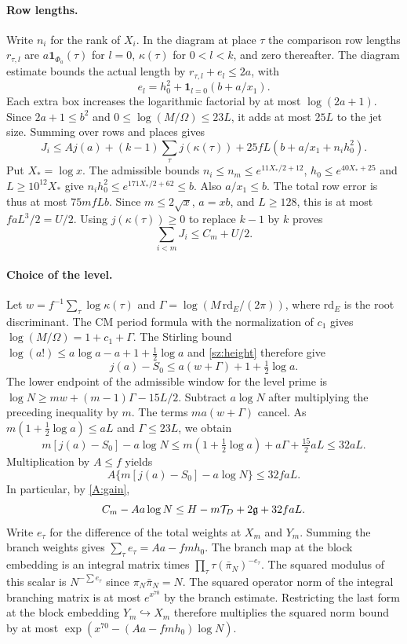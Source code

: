 \paragraph{Row lengths.}
Write $n_i$ for the rank of $X_i$. In the diagram at place $\tau$ the comparison row lengths $r_{\tau,l}$ are $a\mathbf1_{\Phi_a}(\tau)$ for $l=0$, $\kappa(\tau)$ for $0<l<k$, and zero thereafter. The diagram estimate bounds the actual length by $r_{\tau,l}+e_l\le2a$, with
\[
 e_l=h_0^2+\mathbf1_{l=0}(b+a/x_1).
\]
Each extra box increases the logarithmic factorial by at most $\log(2a+1)$. Since $2a+1\le b^2$ and $0\le\log(M/\Omega)\le23L$, it adds at most $25L$ to the jet size. Summing over rows and places gives
\[
 J_i\le A j(a)+(k-1)\sum_\tau j(\kappa(\tau))
             +25fL(b+a/x_1+n_i h_0^2).
\]
Put $X_*=\log x$. The admissible bounds $n_i\le n_m\le e^{11X_*/2+12}$, $h_0\le e^{40X_*+25}$ and $L\ge10^{12}X_*$ give $n_i h_0^2\le e^{171X_*/2+62}\le b$. Also $a/x_1\le b$. The total row error is thus at most $75mfLb$. Since $m\le2\sqrt{x}$, $a=xb$, and $L\ge128$, this is at most $faL^3/2=U/2$. Using $j(\kappa(\tau))\ge0$ to replace $k-1$ by $k$ proves
\begin{equation}
 \sum_{i<m}J_i\le C_m+U/2.\label{A:row}
\end{equation}

\paragraph{Choice of the level.}
Let $w=f^{-1}\sum_\tau\log\kappa(\tau)$ and $\Gamma=\log(M\,\mathrm{rd}_E/(2\pi))$, where $\mathrm{rd}_E$ is the root discriminant. The CM period formula with the normalization of $c_1$ gives $\log(M/\Omega)=1+c_1+\Gamma$. The Stirling bound $\log(a!)\le a\log a-a+1+\tfrac12\log a$ and \eqref{sz:height} therefore give
\[
 j(a)-S_0\le a(w+\Gamma)+1+\tfrac12\log a.
\]
The lower endpoint of the admissible window for the level prime is $\log N\ge mw+(m-1)\Gamma-15L/2$. Subtract $a\log N$ after multiplying the preceding inequality by $m$. The terms $ma(w+\Gamma)$ cancel. As $m(1+\tfrac12\log a)\le aL$ and $\Gamma\le23L$, we obtain
\[
 m[j(a)-S_0]-a\log N
 \le m(1+\tfrac12\log a)+a\Gamma+\tfrac{15}2aL\le32aL.
\]
Multiplication by $A\le f$ yields
\begin{equation}
 A\{m[j(a)-S_0]-a\log N\}\le32faL.\label{A:level}
\end{equation}
In particular, by \eqref{A:gain},
\[
 C_m-Aa\log N\le H-m\mathcal T_D+2\mathfrak g+32faL.
\]
Write $e_\tau$ for the difference of the total weights at $X_m$ and $Y_m$. Summing the branch weights gives $\sum_\tau e_\tau=Aa-fmh_0$. The branch map at the block embedding is an integral matrix times $\prod_\tau\tau(\bar\pi_N)^{-e_\tau}$. The squared modulus of this scalar is $N^{-\sum e_\tau}$ since $\pi_N\bar\pi_N=N$. The squared operator norm of the integral branching matrix is at most $e^{x^{70}}$ by the branch estimate. Restricting the last form at the block embedding $Y_m\hookrightarrow X_m$ therefore multiplies the squared norm bound by at most $\exp(x^{70}-(Aa-fmh_0)\log N)$.

